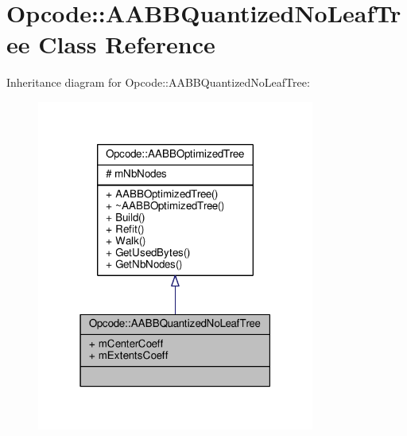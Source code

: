 \hypertarget{classOpcode_1_1AABBQuantizedNoLeafTree}{}\section{Opcode\+:\+:A\+A\+B\+B\+Quantized\+No\+Leaf\+Tree Class Reference}
\label{classOpcode_1_1AABBQuantizedNoLeafTree}


Inheritance diagram for Opcode\+:\+:A\+A\+B\+B\+Quantized\+No\+Leaf\+Tree\+:
\nopagebreak
\begin{figure}[H]
\begin{center}
\leavevmode
\includegraphics[width=259pt]{da/dce/classOpcode_1_1AABBQuantizedNoLeafTree__inherit__graph}
\end{center}
\end{figure}


